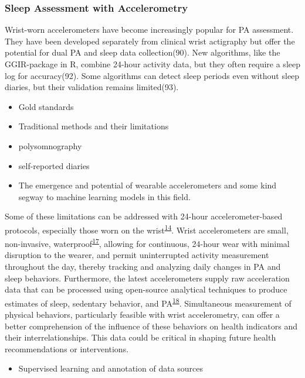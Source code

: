 \documentclass[
  9pt,
]{article}
\providecommand{\tightlist}{%
  \setlength{\itemsep}{0pt}\setlength{\parskip}{0pt}}\usepackage{longtable,booktabs,array}
\begin{document}
\hypertarget{sleep-assessment-with-accelerometry}{%
\subsubsection{Sleep Assessment with
Accelerometry}\label{sleep-assessment-with-accelerometry}}

Wrist-worn accelerometers have become increasingly popular for PA
assessment. They have been developed separately from clinical wrist
actigraphy but offer the potential for dual PA and sleep data
collection(90). New algorithms, like the GGIR-package in R, combine
24-hour activity data, but they often require a sleep log for
accuracy(92). Some algorithms can detect sleep periods even without
sleep diaries, but their validation remains limited(93).

\begin{itemize}
\tightlist
\item
  Gold standards
\item
  Traditional methods and their limitations
\item
  polysomnography
\item
  self-reported diaries
\item
  The emergence and potential of wearable accelerometers and some kind
  segway to machine learning models in this field.
\end{itemize}

Some of these limitations can be addressed with 24-hour
accelerometer-based protocols, especially those worn on the
wrist\textsuperscript{\protect\hyperlink{ref-rosenberger_24-hour_2019}{14}}.
Wrist accelerometers are small, non-invasive,
waterproof\textsuperscript{\protect\hyperlink{ref-welk_reliability_2004}{17}},
allowing for continuous, 24-hour wear with minimal disruption to the
wearer, and permit uninterrupted activity measurement throughout the
day, thereby tracking and analyzing daily changes in PA and sleep
behaviors. Furthermore, the latest accelerometers supply raw
acceleration data that can be processed using open-source analytical
techniques to produce estimates of sleep, sedentary behavior, and
PA\textsuperscript{\protect\hyperlink{ref-migueles_comparability_2019}{18}}.
Simultaneous measurement of physical behaviors, particularly feasible
with wrist accelerometry, can offer a better comprehension of the
influence of these behaviors on health indicators and their
interrelationships. This data could be critical in shaping future health
recommendations or interventions.

\begin{itemize}
\tightlist
\item
  Supervised learning and annotation of data sources
\end{itemize}
\end{document}
